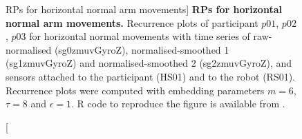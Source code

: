 \begin{figure}
\caption
	[RPs for horizontal normal arm movements]{
	{\bf RPs for horizontal normal arm movements.}	
	Recurrence plots %
	of participant $p01$, $p02$, $p03$ for horizontal normal 
	movements with time series of raw-normalised (sg0zmuvGyroZ), 
	normalised-smoothed 1 (sg1zmuvGyroZ) and 
	normalised-smoothed 2 (sg2zmuvGyroZ), and 
	sensors attached to the participant (HS01) and to the robot (RS01).
	Recurrence plots were computed with 
	embedding parameters $m=6$, $\tau=8$ and $\epsilon=1$.
	R code to reproduce the figure is available from \cite{xochicale2018}.
        }
    \label{fig:rp_HN}
\end{figure}



